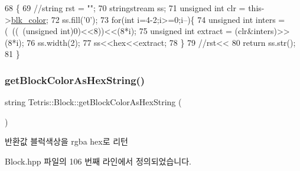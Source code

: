 \begin{DoxyCode}
68                                       \{
69                 \textcolor{comment}{//string rst = "";}
70                 stringstream ss;
71                 \textcolor{keywordtype}{unsigned} \textcolor{keywordtype}{int} clr = this->\hyperlink{class_tetris_1_1_block_acf78e864526e38c9c72fa0b012d5b344}{blk\_color};
72                 ss.fill(\textcolor{charliteral}{'0'});
73                 \textcolor{keywordflow}{for}(\textcolor{keywordtype}{int} i=4-2;i>=0;i--)\{
74                     \textcolor{keywordtype}{unsigned} \textcolor{keywordtype}{int} inters = (~((~(\textcolor{keywordtype}{unsigned} int)0)<<8))<<(8*i);
75                     \textcolor{keywordtype}{unsigned} \textcolor{keywordtype}{int} extract = (clr&inters)>>(8*i);
76                     ss.width(2);
77                     ss<<hex<<extract;
78                 \}
79                 \textcolor{comment}{//rst<<}
80                 \textcolor{keywordflow}{return} ss.str();
81             \}
\end{DoxyCode}
\mbox{\label{class_tetris_1_1_block_a0adf3e3fbe9899115703913f18aaae6d}} 
\subsubsection{\texorpdfstring{get\+Block\+Color\+As\+Hex\+String()}{getBlockColorAsHexString()}\hspace{0.1cm}{\footnotesize\ttfamily [2/2]}}
{\footnotesize\ttfamily string Tetris\+::\+Block\+::get\+Block\+Color\+As\+Hex\+String (\begin{DoxyParamCaption}{ }\end{DoxyParamCaption})\hspace{0.3cm}{\ttfamily [inline]}}

\begin{DoxyReturn}{반환값}
블럭색상을 rgba hex로 리턴 
\end{DoxyReturn}


Block.\+hpp 파일의 106 번째 라인에서 정의되었습니다.


